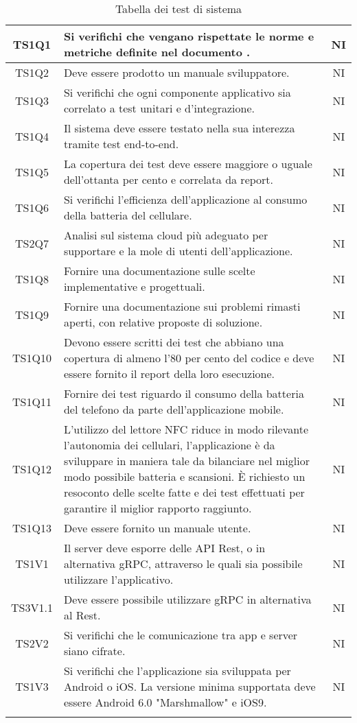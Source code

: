 \begin{center}
\begin{longtable}{|c|p{10cm}|c|}
			TS1Q1 & Si verifichi che vengano rispettate le norme e metriche definite nel documento \dext{Piano di Qualifica v. 1.0.0}. & NI \\	
			\hline			
			TS1Q2 & Deve essere prodotto un manuale sviluppatore. & NI \\	
			\hline	
			TS1Q3 & Si verifichi che ogni componente applicativo sia correlato a test unitari e d'integrazione. & NI \\	
			\hline
			TS1Q4 & Il sistema deve essere testato nella sua interezza tramite test end-to-end. & NI \\	
			\hline
			TS1Q5 & La copertura dei test deve essere maggiore o uguale dell'ottanta per cento e correlata da report. & NI \\	
			\hline
			TS1Q6 & Si verifichi l'efficienza dell'applicazione al consumo della batteria del cellulare. & NI \\	
			\hline
			TS2Q7 & Analisi sul sistema cloud più adeguato per supportare e la mole di utenti dell'applicazione. & NI \\	
			\hline
			TS1Q8 & Fornire una documentazione sulle scelte implementative e progettuali. & NI \\	
			\hline
			TS1Q9 & Fornire una documentazione sui problemi rimasti aperti, con relative proposte di soluzione. & NI \\	
			\hline
			TS1Q10 & Devono essere scritti dei test che abbiano una copertura di almeno l'80 per cento del codice e deve essere fornito il report della loro esecuzione. & NI \\	
			\hline
			TS1Q11 & Fornire dei test riguardo il consumo della batteria del telefono da parte dell'applicazione mobile. & NI \\	
			\hline
			TS1Q12 & L’utilizzo del lettore NFC riduce in modo rilevante l’autonomia dei cellulari, l’applicazione è da sviluppare in maniera tale da bilanciare nel miglior modo possibile batteria e scansioni. È richiesto un resoconto delle scelte fatte e dei test effettuati per garantire il miglior rapporto raggiunto. & NI \\	
			\hline
			TS1Q13 & Deve essere fornito un manuale utente. & NI \\	
			\hline
			TS1V1 & Il server deve esporre delle API Rest, o in alternativa gRPC, attraverso le quali sia possibile utilizzare l'applicativo. & NI \\	
			\hline
			TS3V1.1 & Deve essere possibile utilizzare gRPC in alternativa al Rest. & NI \\	
			\hline
			TS2V2 & Si verifichi che le comunicazione tra app e server siano cifrate. & NI \\	
			\hline
			TS1V3 & Si verifichi che l'applicazione sia sviluppata per Android o iOS. La versione minima supportata deve essere  Android 6.0 "Marshmallow" e iOS9. & NI \\	
			\hline
			\hiderowcolors
			\caption{Tabella dei test di sistema}		
		\end{longtable}	
	\end{center}

